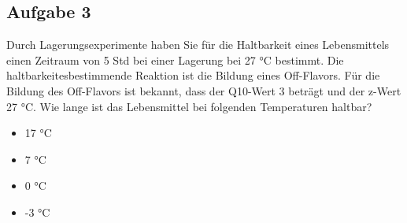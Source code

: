\documentclass[a4paper,10pt]{article}
\newif\ifshowme
\begin{document}
\begin{multicols}{2}
\ifshowme
\antwort{
\begin{align*}
m_1 \cdot c_1 + m_2 \cdot c_2 &= m_3 \cdot c_3 \\
m_1 \cdot c_1 + m_3 \cdot c_2 - m_1 \cdot c_2 &= m_3 \cdot c_3 \\
m_1 \cdot c_1  - m_1 \cdot c_2 &= m_3 (c_3 - c_2)  \\
\frac{m_1 \cdot c_1  - m_1 \cdot c_2}{c_3 - c_2} &= m_3
\end{align*}
Werte einsetzen:
\begin{align*}
m_3 &= \frac{500 \cdot 0,13  - 500 \cdot 0}{0,4 - 0} \\
 &= \frac{65}{0,4} \\
 &= 162,5
\end{align*}
Demnach müssen 337,5 g Wasser entzogen werden.
}
\else
\columnbreak
\fi 

\subsection*{Aufgabe 3}
Durch Lagerungsexperimente haben Sie für die Haltbarkeit eines Lebensmittels einen 
Zeitraum von 5 Std bei einer Lagerung bei 27 °C bestimmt. Die haltbarkeitesbestimmende 
Reaktion ist die Bildung eines Off-Flavors. Für die Bildung des Off-Flavors ist bekannt, dass 
der Q10-Wert 3 beträgt und der z-Wert 27 °C. Wie lange ist das Lebensmittel bei folgenden 
Temperaturen haltbar? 
\begin{itemize}
\item 17 °C
\item 7 °C
\item 0 °C
\item -3 °C
\end{itemize}

\ifshowme
\antwort{
15, 45, 50, 135 Std.
\begin{align}
t_2 = t_1 \cdot Q_{10}^{\frac{T_1-T_2}{10}} \\
t_2 = t_1 \cdot 10^{\frac{T_1-T_2}{z}}
\end{align}
}
\pagebreak
\else
\vspace*{8mm}
\fi


\end{multicols}
\end{document}
